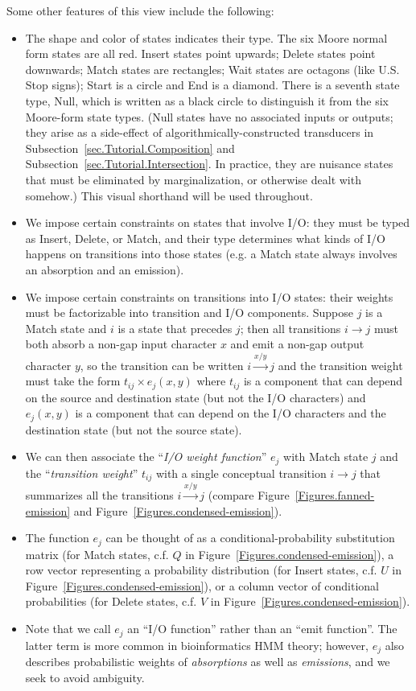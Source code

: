 \documentclass{article}
\newcommand{\secref}[1]{Subsection~\ref{sec.#1}}
\newcommand{\figref}[1]{Figure~\ref{Figures.#1}}
\begin{document}
Some other features of this view include the following:
\begin{itemize}
\item The shape and color of states indicates their type.
The six Moore normal form states are all red.
Insert states point upwards; Delete states point downwards; Match states are rectangles; Wait states are octagons (like U.S. Stop signs);
Start is a circle and End is a diamond.
There is a seventh state type, Null, which is written as a black circle to distinguish it from the six Moore-form state types.
(Null states have no associated inputs or outputs; they arise as a side-effect of algorithmically-constructed transducers in \secref{Tutorial.Composition} and \secref{Tutorial.Intersection}.
In practice, they are nuisance states that must be eliminated by marginalization, or otherwise dealt with somehow.)
This visual shorthand will be used throughout.
\item We impose certain constraints on states that involve I/O:
 they must be typed  as Insert, Delete, or Match, and
 their type determines what kinds of I/O happens on transitions into those states (e.g. a Match state always involves an absorption and an emission).
\item We impose certain constraints on transitions into I/O states:
 their weights must be factorizable into transition and I/O components.
 Suppose $j$ is a Match state and $i$ is a state that precedes $j$;
 then all transitions $i \to j$ must both absorb a non-gap input character $x$
 and emit a non-gap output character $y$,
 so the transition can be written $i \stackrel{x/y}{\longrightarrow} j$
 and the transition weight must take the form $t_{ij} \times e_j(x,y)$
 where $t_{ij}$ is a component that can depend on the source and destination state
  (but not the I/O characters)
 and $e_j(x,y)$ is a component that can depend on the I/O characters and the destination state
  (but not the source state).
\item We can then associate the ``{\em I/O weight function}'' $e_j$ with Match state $j$
 and the ``{\em transition weight}'' $t_{ij}$ with a single conceptual transition $i \to j$
 that summarizes all the transitions $i \stackrel{x/y}{\to} j$
 (compare \figref{fanned-emission} and \figref{condensed-emission}).
\item The function $e_j$ can be thought of as a conditional-probability substitution matrix
 (for Match states, c.f. $Q$ in \figref{condensed-emission}),
a row vector representing a probability distribution
 (for Insert states, c.f. $U$ in \figref{condensed-emission}),
or a column vector of conditional probabilities
 (for Delete states, c.f. $V$ in \figref{condensed-emission}).
\item Note that we call $e_j$ an ``I/O function'' rather than an ``emit function''.
The latter term is more common in bioinformatics HMM theory;
however, $e_j$ also describes probabilistic weights of {\em absorptions} as well as {\em emissions},
and we seek to avoid ambiguity.
\end{itemize}
\end{document}
